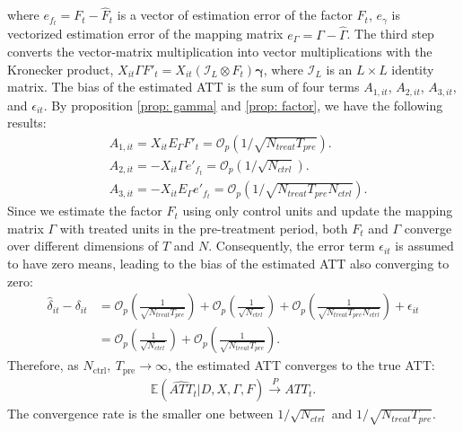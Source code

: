 \documentclass[12pt]{article}
\begin{document}
\noindent where $e_{f_t} = F_t - \hat{F}_t$ is a vector of estimation error of the factor $F_t$, $e_{\gamma}$ is vectorized estimation error of the mapping matrix $e_{\Gamma} = \Gamma - \hat{\Gamma}$. The third step converts the vector-matrix multiplication into vector multiplications with the Kronecker product, $X_{it}\Gamma F'_t = X_{it}(\mathcal{I}_L \otimes F_t)\bm{\gamma}$, where $\mathcal{I}_L$ is an $L \times L$ identity matrix. The bias of the estimated ATT is the sum of four terms $A_{1,it}$, $A_{2,it}$, $A_{3,it}$, and $\epsilon_{it}$. By proposition \ref{prop: gamma} and \ref{prop: factor}, we have the following results:
\begin{equation*}
\begin{aligned}
    &A_{1,it} = X_{it}E_{\Gamma} F'_t = \mathcal{O}_p\left(1/\sqrt{N_{treat}T_{pre}}\right). \\
    &A_{2,it} = -X_{it}\Gamma e'_{f_t} = \mathcal{O}_p\left(1/\sqrt{N_{ctrl}}\right). \\
    &A_{3,it} = -X_{it}E_{\Gamma} e'_{f_t} = \mathcal{O}_p\left(1/\sqrt{N_{treat}T_{pre}N_{ctrl}}\right).
\end{aligned}
\end{equation*}
Since we estimate the factor $F_t$ using only control units and update the mapping matrix $\Gamma$ with treated units in the pre-treatment period, both $F_t$ and $\Gamma$ converge over different dimensions of $T$ and $N$. Consequently, the error term $\epsilon_{it}$ is assumed to have zero means, leading to the bias of the estimated ATT also converging to zero:
\begin{equation*}
\begin{aligned}
    \hat{\delta}_{it} - \delta_{it} &= \mathcal{O}_p\left(\frac{1}{\sqrt{N_{treat}T_{pre}}}\right) + \mathcal{O}_p\left(\frac{1}{\sqrt{N_{ctrl}}}\right) + \mathcal{O}_p\left(\frac{1}{\sqrt{N_{treat}T_{pre}N_{ctrl}}}\right) + \epsilon_{it} \\
    &= \mathcal{O}_p\left(\frac{1}{\sqrt{N_{ctrl}}} \right) + \mathcal{O}_p\left(\frac{1}{\sqrt{N_{treat}T_{pre}}} \right).
\end{aligned}
\end{equation*}
Therefore, as $N_{\text{ctrl}}, \ T_{\text{pre}} \to \infty$, the estimated ATT converges to the true ATT:
\begin{equation*}
\begin{aligned}
    \mathbb{E}\left(\widehat{ATT}_{t} | D, X, \Gamma, F\right) \xrightarrow{P} ATT_{t}.
\end{aligned}
\end{equation*}
The convergence rate is the smaller one between $1/\sqrt{N_{ctrl}}$ and $1/\sqrt{N_{treat}T_{pre}}$.
\end{document}
